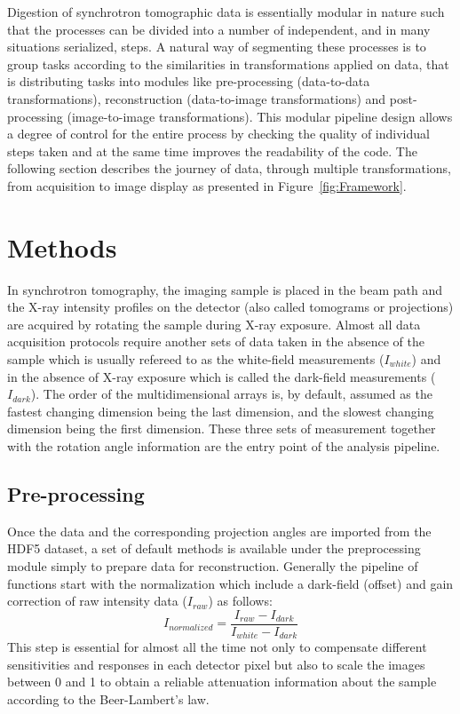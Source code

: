 \documentclass[pdf]{iucr}              %
\begin{document}
Digestion of synchrotron tomographic data is essentially modular in nature such that the processes can be divided into a number of independent, and in many situations serialized, steps. A natural way of segmenting these processes is to group tasks according to the similarities in transformations applied on data, that is distributing tasks into modules like pre-processing (data-to-data transformations), reconstruction (data-to-image transformations) and post-processing (image-to-image transformations). This modular pipeline design allows a degree of control for the entire process by checking the quality of individual steps taken and at the same time improves the readability of the code. The following section describes the journey of data, through multiple transformations, from acquisition to image display as presented in Figure~\ref{fig:Framework}.

\section{Methods} 

In synchrotron tomography, the imaging sample is placed in the beam path and the X-ray intensity profiles on the detector (also called tomograms or projections) are acquired by rotating the sample during X-ray exposure. Almost all data acquisition protocols require another sets of data taken in the absence of the sample which is usually refereed to as the white-field measurements ($I_{white}$) and in the absence of X-ray exposure which is called the dark-field measurements ($I_{dark}$). The order of the multidimensional arrays is, by default, assumed as the fastest changing dimension being the last dimension, and the slowest changing dimension being the first dimension. These three sets of measurement together with the rotation angle information are the entry point of the analysis pipeline.

\subsection{Pre-processing} 

Once the data and the corresponding projection angles are imported from the HDF5 dataset, a set of default methods is available under the preprocessing module simply to prepare data for reconstruction. Generally the pipeline of functions start with the normalization which include a dark-field (offset) and gain correction of raw intensity data ($I_{raw}$) as follows:
\begin{equation}
I_{normalized}=\frac{I_{raw}-I_{dark}}{I_{white}-I_{dark}}
\end{equation}
This step is essential for almost all the time not only to compensate different sensitivities and responses in each detector pixel but also to scale the images between 0 and 1 to obtain a reliable attenuation information about the sample according to the Beer-Lambert's law. 
\end{document}
